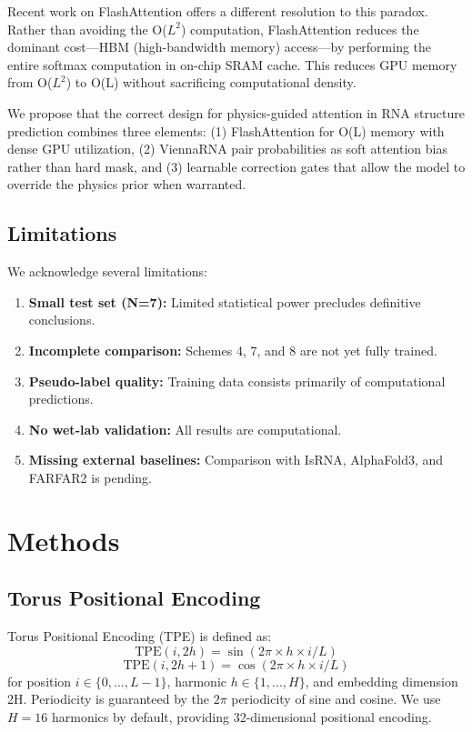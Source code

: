 Recent work on FlashAttention \citep{dao2023} offers a different resolution to this paradox. Rather than avoiding the O($L^2$) computation, FlashAttention reduces the dominant cost---HBM (high-bandwidth memory) access---by performing the entire softmax computation in on-chip SRAM cache. This reduces GPU memory from O($L^2$) to O(L) without sacrificing computational density.

We propose that the correct design for physics-guided attention in RNA structure prediction combines three elements: (1) FlashAttention for O(L) memory with dense GPU utilization, (2) ViennaRNA pair probabilities as soft attention bias rather than hard mask, and (3) learnable correction gates that allow the model to override the physics prior when warranted.

\subsection{Limitations}

We acknowledge several limitations:
\begin{enumerate}
\item \textbf{Small test set (N=7):} Limited statistical power precludes definitive conclusions.
\item \textbf{Incomplete comparison:} Schemes 4, 7, and 8 are not yet fully trained.
\item \textbf{Pseudo-label quality:} Training data consists primarily of computational predictions.
\item \textbf{No wet-lab validation:} All results are computational.
\item \textbf{Missing external baselines:} Comparison with IsRNA, AlphaFold3, and FARFAR2 is pending.
\end{enumerate}

\section{Methods}

\subsection{Torus Positional Encoding}

Torus Positional Encoding (TPE) is defined as:
\begin{equation}
\text{TPE}(i, 2h) = \sin(2\pi \times h \times i / L)
\end{equation}
\begin{equation}
\text{TPE}(i, 2h+1) = \cos(2\pi \times h \times i / L)
\end{equation}
for position $i \in \{0, ..., L-1\}$, harmonic $h \in \{1, ..., H\}$, and embedding dimension 2H. Periodicity is guaranteed by the $2\pi$ periodicity of sine and cosine. We use $H = 16$ harmonics by default, providing 32-dimensional positional encoding.


